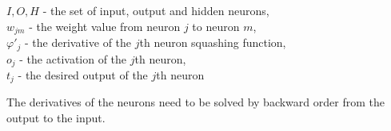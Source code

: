 \noindent $I, O, H$ - the set of input, output and hidden neurons,\\
$w_{jm}$ - the weight value from neuron $j$ to neuron $m$,\\
$\varphi'_j$ - the derivative of the $j$th neuron squashing function,\\
$o_j$ - the activation of the $j$th neuron,\\
$t_j$ - the desired output of the $j$th neuron \bigskip

The derivatives of the neurons need to be solved by backward order from the output to the input.

